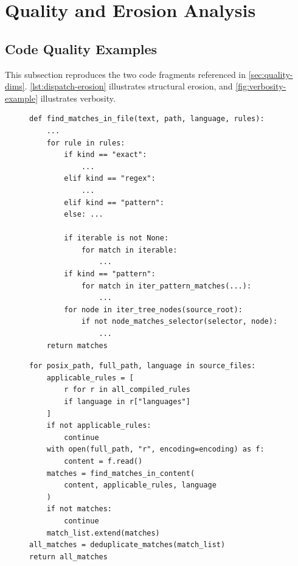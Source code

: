 \section{Quality and Erosion Analysis}\label{sec:appendix-quality}

\subsection{Code Quality Examples}\label{sec:appendix-quality-examples}

This subsection reproduces the two \codesearch{} code fragments referenced in \autoref{sec:quality-dims}. \autoref{lst:dispatch-erosion} illustrates structural erosion, and \autoref{fig:verbosity-example} illustrates verbosity.

\begin{figure}[h]
\begin{lstlisting}[caption={Structurally eroded \texttt{find\_matches\_in\_file()} in \codesearch{} at $\ckpt{5}$ (117 lines total). Nearly all decision-point mass ends up in one function.},label={lst:dispatch-erosion}]
def find_matches_in_file(text, path, language, rules):
    ...
    for rule in rules:
        if kind == "exact":
            ...
        elif kind == "regex":
            ...
        elif kind == "pattern":
        else: ...

        if iterable is not None:
            for match in iterable:
                ...
        if kind == "pattern":
            for match in iter_pattern_matches(...):
                ...
        for node in iter_tree_nodes(source_root):
            if not node_matches_selector(selector, node):
                ...
    return matches
\end{lstlisting}
\end{figure}

\begin{figure}[h]
\begin{lstlisting}[caption={Overly verbose code from \codesearch{}. Identity list comprehension instead of \texttt{filter}, empty checks instead of building around iteration, and single-use variables.},label={fig:verbosity-example}]
for posix_path, full_path, language in source_files:
    applicable_rules = [
        r for r in all_compiled_rules
        if language in r["languages"]
    ]
    if not applicable_rules:
        continue
    with open(full_path, "r", encoding=encoding) as f:
        content = f.read()
    matches = find_matches_in_content(
        content, applicable_rules, language
    )
    if not matches:
        continue
    match_list.extend(matches)
all_matches = deduplicate_matches(match_list)
return all_matches
\end{lstlisting}
\end{figure}

